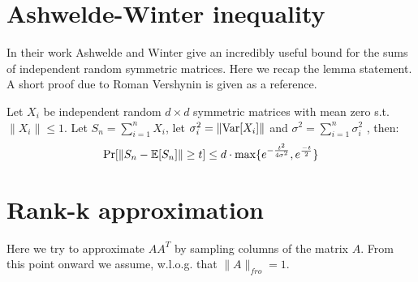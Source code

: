 \documentclass{article}
\begin{document}


\section{Ashwelde-Winter inequality}
In their work \cite{AhlswedeW02} Ashwelde and Winter give an incredibly useful bound for 
the sums of independent random symmetric matrices.
Here we recap the lemma statement. 
A short proof due to Roman Vershynin \cite{VershyninMatrixChernoffBounds} is given as a reference.
 
\begin{lemma}
Let $X_i$ be independent random $d \times d$ symmetric matrices with mean zero s.t. $\|X_i\| \le 1$.
Let $S_n = \sum_{i=1}^{n}X_i$, let $\sigma^2_i = \|{\operatorname{Var}}[X_i]\|$ and $\sigma^2 = \sum_{i=1}^{n}\sigma^2_i$ , then:
\[
\Pr[\| S_n - {\mathbb E}[S_n] \| \ge t] \le d\cdot \max\{e^{-\frac{t^2}{4\sigma^2}}, e^{\frac{-t}{2}}\}
\] 
\end{lemma}

\section{Rank-k approximation}

Here we try to approximate $AA^T$ by sampling columns of the matrix $A$.
From this point onward we assume, w.l.o.g. that $\|A\|_{fro} = 1$.
\end{document}
